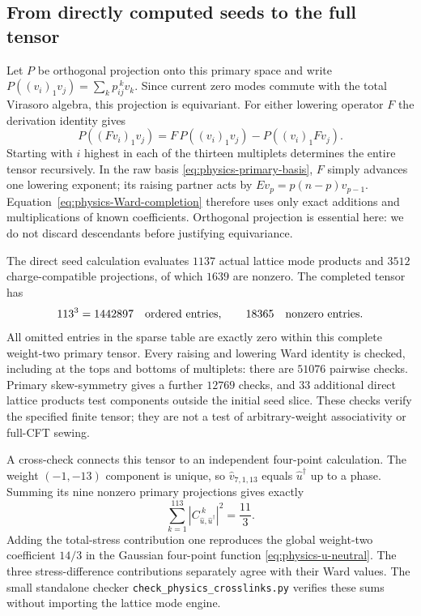 \documentclass[11pt,a4paper]{article}
\theoremstyle{definition}
\newcommand{\artifact}[1]{\textnormal{\nolinkurl{#1}}}
\begin{document}
\subsection{From directly computed seeds to the full tensor}

Let $P$ be orthogonal projection onto this primary space and write
$P((v_i)_1v_j)=\sum_k p_{ij}^{\ k}v_k$. Since current zero modes
commute with the total Virasoro algebra, this projection is equivariant.
For either lowering operator $F$ the derivation identity gives
\begin{equation}\label{eq:physics-Ward-completion}
 P((Fv_i)_1v_j)=F\,P((v_i)_1v_j)-P((v_i)_1Fv_j).
\end{equation}
Starting with $i$ highest in each of the thirteen multiplets determines
the entire tensor recursively. In the raw basis \eqref{eq:physics-primary-basis},
$F$ simply advances one lowering exponent; its raising partner acts
by $E v_p=p(n-p)v_{p-1}$. Equation~\eqref{eq:physics-Ward-completion}
therefore uses only exact additions and multiplications of known
coefficients. Orthogonal projection is essential here: we do not
discard descendants before justifying equivariance.

The direct seed calculation evaluates $1137$ actual lattice mode
products and $3512$ charge-compatible projections, of which $1639$
are nonzero. The completed tensor has
\[
 113^3=1442897\quad\hbox{ordered entries},\qquad
 18365\quad\hbox{nonzero entries}.
\]
All omitted entries in the sparse table are exactly zero within this
complete weight-two primary tensor. Every raising and lowering Ward
identity is checked, including at the tops and bottoms of multiplets:
there are $51076$ pairwise checks. Primary skew-symmetry gives a
further $12769$ checks, and $33$ additional direct lattice products
test components outside the initial seed slice. These checks verify
the specified finite tensor; they are not a test of arbitrary-weight
associativity or full-CFT sewing.

A cross-check connects this tensor to an independent four-point
calculation. The weight $(-1,-13)$ component is unique, so
$\widehat v_{7,1,13}$ equals $\widehat u^\dagger$ up to a phase.
Summing its nine nonzero primary projections gives exactly
\[
 \sum_{k=1}^{113}|C_{\widehat u,\widehat u^\dagger}^{\ k}|^2
 =\frac{11}{3}.
\]
Adding the total-stress contribution one reproduces the global
weight-two coefficient $14/3$ in the Gaussian four-point function
\eqref{eq:physics-u-neutral}. The three stress-difference contributions
separately agree with their Ward values. The small standalone checker
\artifact{check_physics_crosslinks.py} verifies these sums without
importing the lattice mode engine.
\end{document}
